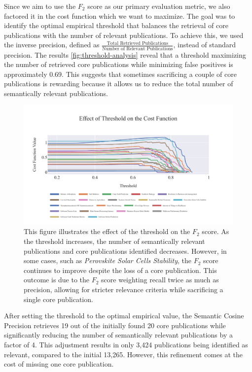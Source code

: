 Since we aim to use the $F_2$ score as our primary evaluation metric, we also factored it in the cost function which we want to maximize. The goal was to identify the optimal empirical threshold that balances the retrieval of core publications with the number of relevant publications. To achieve this, we used the inverse precision, defined as {\scriptsize$\frac{\text{Total Retrieved Publications}}{\text{Number of Relevant Publications}}$}, instead of standard precision. The results \autoref{fig:threshold-analysis} reveal that a threshold maximizing the number of retrieved core publications while minimizing false positives is approximately 0.69. This suggests that sometimes sacrificing a couple of core publications is rewarding because it allows us to reduce the total number of semantically relevant publications.

\begin{figure}
	\centering	
	\includegraphics[scale=0.6]{pics/threshold-analysis.pdf}
	\caption[Semantic Cosine Threshold: Empirical Analysis]{This figure illustrates the effect of the threshold on the $F_2$ score. As the threshold increases, the number of semantically relevant publications and core publications identified decreases. However, in some cases, such as \textit{Perovskite Solar Cells Stability}, the $F_2$ score continues to improve despite the loss of a core publication. This outcome is due to the $F_2$ score weighting recall twice as much as precision, allowing for stricter relevance criteria while sacrificing a single core publication.}\label{fig:threshold-analysis}
\end{figure}

After setting the threshold to the optimal empirical value, the Semantic Cosine Precision retrieves 19 out of the initially found 20 core publications while significantly reducing the number of semantically relevant publications by a factor of 4. This adjustment results in only 3,424 publications being identified as relevant, compared to the initial 13,265. However, this refinement comes at the cost of missing one core publication.

